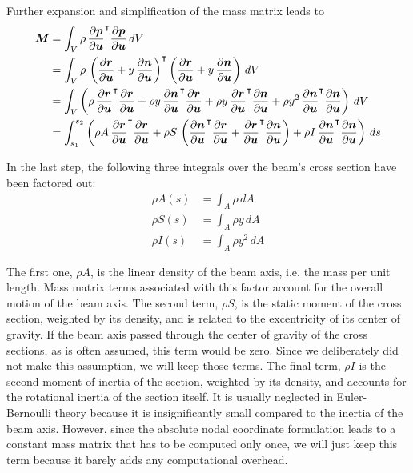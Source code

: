 Further expansion and simplification of the mass matrix leads to
%
\begin{align}
\boldsymbol{M} &= \int_{V} \rho\,\frac{\partial\boldsymbol{p}}{\partial\boldsymbol{u}}^\intercal\frac{\partial\boldsymbol{p}}{\partial\boldsymbol{u}}\,dV \notag \\
&= \int_{V} \rho\,\left(\frac{\partial\boldsymbol{r}}{\partial\boldsymbol{u}} + y\,\frac{\partial\boldsymbol{n}}{\partial\boldsymbol{u}}\right)^\intercal\left(\frac{\partial\boldsymbol{r}}{\partial\boldsymbol{u}} + y\,\frac{\partial\boldsymbol{n}}{\partial\boldsymbol{u}}\right)\,dV \notag \\
&= \int_{V} \left(\rho\,\frac{\partial\boldsymbol{r}}{\partial\boldsymbol{u}}^\intercal\frac{\partial\boldsymbol{r}}{\partial\boldsymbol{u}} + \rho y\,\frac{\partial\boldsymbol{n}}{\partial\boldsymbol{u}}^\intercal\frac{\partial\boldsymbol{r}}{\partial\boldsymbol{u}} + \rho y\,\frac{\partial\boldsymbol{r}}{\partial\boldsymbol{u}}^\intercal\frac{\partial\boldsymbol{n}}{\partial\boldsymbol{u}} + \rho y^2\,\frac{\partial\boldsymbol{n}}{\partial\boldsymbol{u}}^\intercal\frac{\partial\boldsymbol{n}}{\partial\boldsymbol{u}}\right)\,dV \notag \\
&= \int_{s_1}^{s_2} \left(\rho A\,\frac{\partial\boldsymbol{r}}{\partial\boldsymbol{u}}^\intercal\frac{\partial\boldsymbol{r}}{\partial\boldsymbol{u}} + \rho S\,\left(\frac{\partial\boldsymbol{n}}{\partial\boldsymbol{u}}^\intercal\frac{\partial\boldsymbol{r}}{\partial\boldsymbol{u}} + \frac{\partial\boldsymbol{r}}{\partial\boldsymbol{u}}^\intercal\frac{\partial\boldsymbol{n}}{\partial\boldsymbol{u}}\right) + \rho I\,\frac{\partial\boldsymbol{n}}{\partial\boldsymbol{u}}^\intercal\frac{\partial\boldsymbol{n}}{\partial\boldsymbol{u}}\right)\,ds
\end{align}

In the last step, the following three integrals over the beam's cross section have been factored out:
%
\begin{align}
\rho A(s) &= \int_A \rho\,dA \\
\rho S(s) &= \int_A \rho y\,dA \\
\rho I(s) &= \int_A \rho y^2\,dA
\end{align}

The first one, $\rho A$, is the linear density of the beam axis, i.e. the mass per unit length.
Mass matrix terms associated with this factor account for the overall motion of the beam axis.
The second term, $\rho S$, is the static moment of the cross section, weighted by its density, and is related to the excentricity of its center of gravity.
If the beam axis passed through the center of gravity of the cross sections, as is often assumed, this term would be zero.
Since we deliberately did not make this assumption, we will keep those terms.
The final term, $\rho I$ is the second moment of inertia of the section, weighted by its density, and accounts for the rotational inertia of the section itself.
It is usually neglected in Euler-Bernoulli theory because it is insignificantly small compared to the inertia of the beam axis.
However, since the absolute nodal coordinate formulation leads to a constant mass matrix that has to be computed only once, we will just keep this term because it barely adds any computational overhead.

